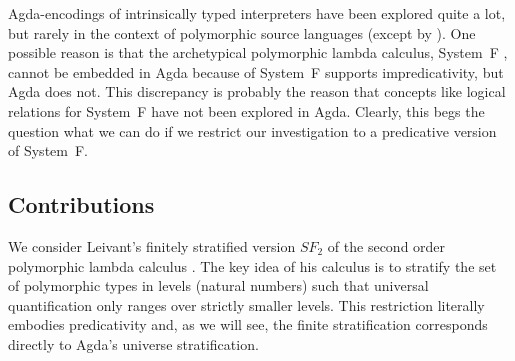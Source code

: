 \documentclass[acmsmall,anonymous,review,screen]{acmart}
\begin{document}
Agda-encodings of intrinsically typed interpreters have been explored
quite a lot, but rarely in the context of polymorphic source
languages (except by \citet{DBLP:conf/mpc/ChapmanKNW19}). One possible
reason is that the archetypical polymorphic 
lambda calculus, System~F \cite{girard72:_inter,DBLP:conf/programm/Reynolds74}, cannot be embedded in Agda because of
System~F supports impredicativity, but Agda does not. This discrepancy
is probably the reason that concepts like logical relations for System~F
have not been explored in Agda.
Clearly, this begs the question what we can do if we restrict our
investigation to a predicative version of System~F.

\subsection*{Contributions}
\label{sec:contributions}

We consider Leivant's finitely stratified version $SF_2$ of the second
order polymorphic
lambda calculus \cite{DBLP:journals/iandc/Leivant91}. The key idea of
his calculus is to stratify the set of polymorphic types in levels
(natural numbers) such that universal quantification only ranges over
strictly smaller levels. This restriction literally embodies predicativity and, as we
will see, the finite stratification corresponds directly to Agda's
universe stratification.
\end{document}

